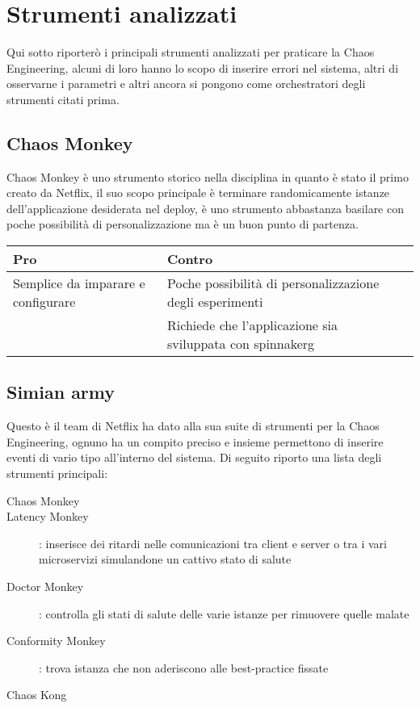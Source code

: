 \section{Strumenti analizzati}
Qui sotto riporterò i principali strumenti analizzati per praticare la Chaos Engineering, alcuni di loro hanno lo scopo di inserire errori nel sistema, altri di osservarne i parametri e altri ancora si pongono come orchestratori degli strumenti citati prima.

\subsection{Chaos Monkey}
Chaos Monkey è uno strumento storico nella disciplina in quanto è stato il primo creato da Netflix, il suo scopo principale è terminare randomicamente istanze dell'applicazione desiderata nel deploy, è uno strumento abbastanza basilare con poche possibilità di personalizzazione ma è un buon punto di partenza.
\begin{center}%
    \label{tab:chaos-monkey}
    \begin{tabularx}{\textwidth}{lXl}
    \hline\hline
    \textbf{Pro} & \textbf{Contro}\\
    \hline
    Semplice da imparare e configurare & Poche possibilità di personalizzazione degli esperimenti \\
     & Richiede che l'applicazione sia sviluppata con \gls{spinnakerg} \\
    \hline
    \end{tabularx}
\end{center}%

\subsection{Simian army}
Questo è il team di Netflix ha dato alla sua suite di strumenti per la Chaos Engineering, ognuno ha un compito preciso e insieme permettono di inserire eventi di vario tipo all'interno del sistema.
Di seguito riporto una lista degli strumenti principali:
\begin{description}
    \item[Chaos Monkey]
    \item[Latency Monkey]: inserisce dei ritardi nelle comunicazioni tra client e server o tra i vari microservizi simulandone un cattivo stato di salute
    \item[Doctor Monkey]: controlla gli stati di salute delle varie istanze per rimuovere quelle malate
    \item[Conformity Monkey]: trova istanza che non aderiscono alle best-practice fissate
    \item[Chaos Kong]  
\end{description}

